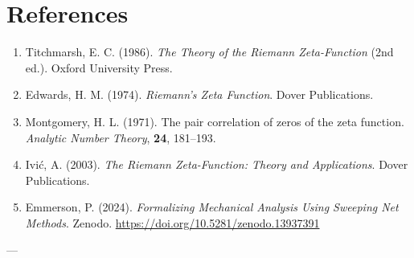 \documentclass{article}
\begin{document}
\section*{References} \begin{enumerate} \item Titchmarsh, E. C. (1986). \textit{The Theory of the Riemann Zeta-Function} (2nd ed.). Oxford University Press. \item Edwards, H. M. (1974). \textit{Riemann's Zeta Function}. Dover Publications. \item Montgomery, H. L. (1971). The pair correlation of zeros of the zeta function. \textit{Analytic Number Theory}, \textbf{24}, 181–193. \item Ivić, A. (2003). \textit{The Riemann Zeta-Function: Theory and Applications}. Dover Publications. \item Emmerson, P. (2024). \textit{Formalizing Mechanical Analysis Using Sweeping Net Methods}. Zenodo. \url{https://doi.org/10.5281/zenodo.13937391}
\end{enumerate} --- 
\end{document}

